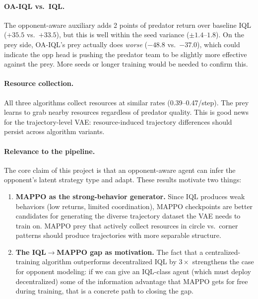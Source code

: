 \documentclass[11pt]{article}
\begin{document}
\paragraph{OA-IQL vs.\ IQL.}
The opponent-aware auxiliary adds 2 points of predator return over
baseline IQL ($+35.5$ vs.\ $+33.5$), but this is well within the seed
variance ($\pm 1.4$--$1.8$).  On the prey side, OA-IQL's prey
actually does \emph{worse} ($-48.8$ vs.\ $-37.0$), which could
indicate the opp head is pushing the predator team to be slightly more
effective against the prey.  More seeds or longer training would be
needed to confirm this.

\paragraph{Resource collection.}
All three algorithms collect resources at similar rates
(0.39--0.47/step).  The prey learns to grab nearby resources
regardless of predator quality.  This is good news for the
trajectory-level VAE: resource-induced trajectory differences should
persist across algorithm variants.

\paragraph{Relevance to the pipeline.}
The core claim of this project is that an opponent-aware agent can
infer the opponent's latent strategy type and adapt.  These results
motivate two things:
\begin{enumerate}[nosep]
\item \textbf{MAPPO as the strong-behavior generator.}  Since IQL
  produces weak behaviors (low returns, limited coordination), MAPPO
  checkpoints are better candidates for generating the diverse
  trajectory dataset the VAE needs to train on.  MAPPO prey that
  actively collect resources in circle vs.\ corner patterns should
  produce trajectories with more separable structure.
\item \textbf{The IQL$\to$MAPPO gap as motivation.}  The fact that
  a centralized-training algorithm outperforms decentralized IQL by
  $3\times$ strengthens the case for opponent modeling: if we can
  give an IQL-class agent (which must deploy decentralized) some of
  the information advantage that MAPPO gets for free during training,
  that is a concrete path to closing the gap.
\end{enumerate}


\end{document}
